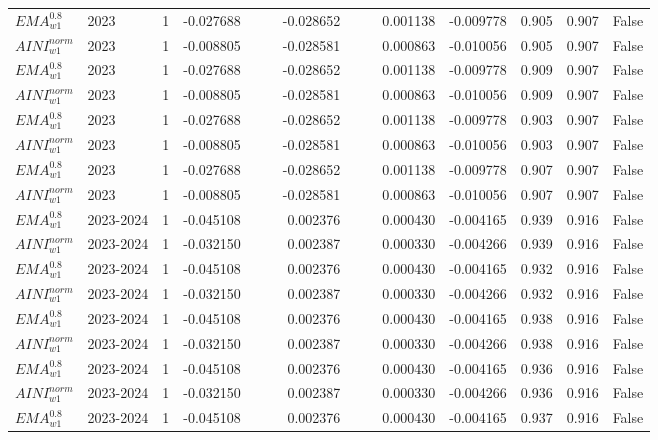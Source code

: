 \begin{tabular}{@{}llrrrrrrrrrlll@{}}
$EMA^{0.8}_{w1}$ & 2023 & 1 & -0.027688 &  &  & -0.028652 &  &  & 0.001138 & -0.009778 & 0.905 & 0.907 & False \\
$AINI^{norm}_{w1}$ & 2023 & 1 & -0.008805 &  &  & -0.028581 &  &  & 0.000863 & -0.010056 & 0.905 & 0.907 & False \\
$EMA^{0.8}_{w1}$ & 2023 & 1 & -0.027688 &  &  & -0.028652 &  &  & 0.001138 & -0.009778 & 0.909 & 0.907 & False \\
$AINI^{norm}_{w1}$ & 2023 & 1 & -0.008805 &  &  & -0.028581 &  &  & 0.000863 & -0.010056 & 0.909 & 0.907 & False \\
$EMA^{0.8}_{w1}$ & 2023 & 1 & -0.027688 &  &  & -0.028652 &  &  & 0.001138 & -0.009778 & 0.903 & 0.907 & False \\
$AINI^{norm}_{w1}$ & 2023 & 1 & -0.008805 &  &  & -0.028581 &  &  & 0.000863 & -0.010056 & 0.903 & 0.907 & False \\
$EMA^{0.8}_{w1}$ & 2023 & 1 & -0.027688 &  &  & -0.028652 &  &  & 0.001138 & -0.009778 & 0.907 & 0.907 & False \\
$AINI^{norm}_{w1}$ & 2023 & 1 & -0.008805 &  &  & -0.028581 &  &  & 0.000863 & -0.010056 & 0.907 & 0.907 & False \\
$EMA^{0.8}_{w1}$ & 2023-2024 & 1 & -0.045108 &  &  & 0.002376 &  &  & 0.000430 & -0.004165 & 0.939 & 0.916 & False \\
$AINI^{norm}_{w1}$ & 2023-2024 & 1 & -0.032150 &  &  & 0.002387 &  &  & 0.000330 & -0.004266 & 0.939 & 0.916 & False \\
$EMA^{0.8}_{w1}$ & 2023-2024 & 1 & -0.045108 &  &  & 0.002376 &  &  & 0.000430 & -0.004165 & 0.932 & 0.916 & False \\
$AINI^{norm}_{w1}$ & 2023-2024 & 1 & -0.032150 &  &  & 0.002387 &  &  & 0.000330 & -0.004266 & 0.932 & 0.916 & False \\
$EMA^{0.8}_{w1}$ & 2023-2024 & 1 & -0.045108 &  &  & 0.002376 &  &  & 0.000430 & -0.004165 & 0.938 & 0.916 & False \\
$AINI^{norm}_{w1}$ & 2023-2024 & 1 & -0.032150 &  &  & 0.002387 &  &  & 0.000330 & -0.004266 & 0.938 & 0.916 & False \\
$EMA^{0.8}_{w1}$ & 2023-2024 & 1 & -0.045108 &  &  & 0.002376 &  &  & 0.000430 & -0.004165 & 0.936 & 0.916 & False \\
$AINI^{norm}_{w1}$ & 2023-2024 & 1 & -0.032150 &  &  & 0.002387 &  &  & 0.000330 & -0.004266 & 0.936 & 0.916 & False \\
$EMA^{0.8}_{w1}$ & 2023-2024 & 1 & -0.045108 &  &  & 0.002376 &  &  & 0.000430 & -0.004165 & 0.937 & 0.916 & False \\

\end{tabular}
